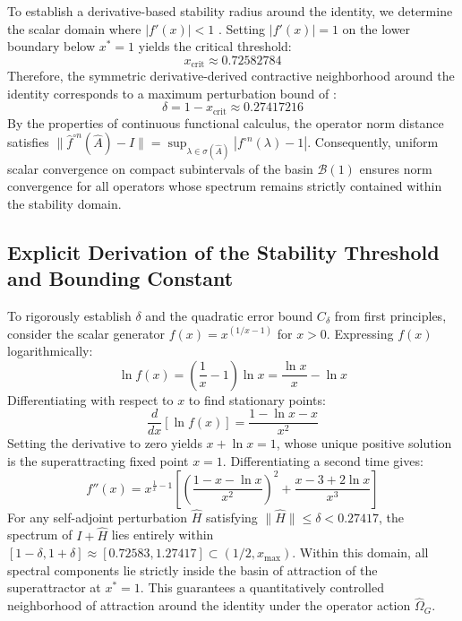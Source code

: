 \documentclass[11pt,a4paper]{article}
\begin{document}
To establish a derivative-based stability radius around the identity, we determine the scalar domain where $|f'(x)| < 1$ \cite{Banach}. Setting $|f'(x)| = 1$ on the lower boundary below $x^* = 1$ yields the critical threshold:
\begin{equation}
x_{\text{crit}} \approx 0.72582784
\end{equation}
Therefore, the symmetric derivative-derived contractive neighborhood around the identity corresponds to a maximum perturbation bound of \cite{Banach}:
\begin{equation}
\delta = 1 - x_{\text{crit}} \approx 0.27417216
\end{equation}
By the properties of continuous functional calculus, the operator norm distance satisfies 
$\|\hat{f}^{\circ n}(\hat{A}) - I\| = \sup_{\lambda \in \sigma(\hat{A})} |f^{\circ n}(\lambda) - 1|$. 
Consequently, uniform scalar convergence on compact subintervals of the basin $\mathcal{B}(1)$ 
ensures norm convergence for all operators whose spectrum remains strictly contained within the stability domain.

\subsection{Explicit Derivation of the Stability Threshold and Bounding Constant}

To rigorously establish $\delta$ and the quadratic error bound $C_\delta$ from first principles, consider the scalar generator $f(x) = x^{(1/x - 1)}$ for $x > 0$. Expressing $f(x)$ logarithmically:
\begin{equation}
\ln f(x) = \left(\frac{1}{x} - 1\right)\ln x = \frac{\ln x}{x} - \ln x
\end{equation}
Differentiating with respect to $x$ to find stationary points:
\begin{equation}
\frac{d}{dx}[\ln f(x)] = \frac{1 - \ln x - x}{x^2}
\end{equation}
Setting the derivative to zero yields $x + \ln x = 1$, whose unique positive solution is the superattracting fixed point $x = 1$. Differentiating a second time gives:
\begin{equation}
f''(x) = x^{\frac{1}{x}-1}\left[\left(\frac{1 - x - \ln x}{x^2}\right)^2 + \frac{x - 3 + 2\ln x}{x^3}\right]
\end{equation}
For any self-adjoint perturbation $\hat{H}$ satisfying $\|\hat{H}\| \le \delta < 0.27417$, the spectrum of $I + \hat{H}$ lies entirely within $[1 - \delta, 1 + \delta] \approx [0.72583, 1.27417] \subset (1/2, x_{\max})$. Within this domain, all spectral components lie strictly inside the basin of attraction of the superattractor at $x^* = 1$. This guarantees a quantitatively controlled neighborhood of attraction around the identity under the operator action $\hat{\Omega}_G$.
\end{document}
